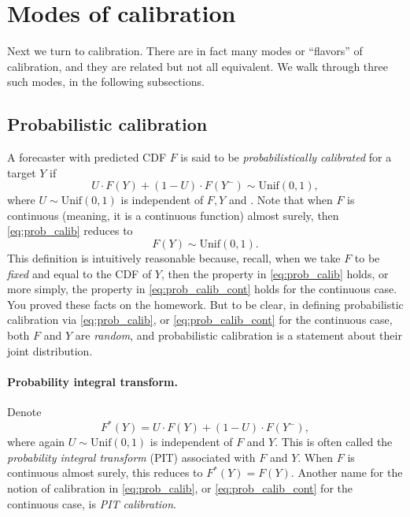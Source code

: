 \documentclass{article}
\begin{document}
\section{Modes of calibration}

Next we turn to calibration. There are in fact many modes or ``flavors'' of
calibration, and they are related but not all equivalent. We walk through three
such modes, in the following subsections.  

\subsection{Probabilistic calibration}

A forecaster with predicted CDF $F$ is said to be \emph{probabilistically 
  calibrated} for a target $Y$ if 
\begin{equation}
\label{eq:prob_calib}
U \cdot F(Y) + (1-U) \cdot F(Y^-) \sim \mathrm{Unif}(0,1),
\end{equation}
where $U \sim \mathrm{Unif}(0,1)$ is independent of $F,Y$ and . Note that when $F$ is continuous (meaning, it is a
continuous function) almost surely, then \eqref{eq:prob_calib} reduces to 
\begin{equation}
\label{eq:prob_calib_cont}
F(Y) \sim \mathrm{Unif}(0,1).
\end{equation}
This definition is intuitively reasonable because, recall, when we take $F$ to
be \emph{fixed} and equal to the CDF of $Y$, then the property in
\eqref{eq:prob_calib} holds, or more simply, the property in
\eqref{eq:prob_calib_cont} holds for the continuous case. You proved these facts
on the homework.  But to be clear, in defining probabilistic calibration via
\eqref{eq:prob_calib}, or \eqref{eq:prob_calib_cont} for the continuous case,
both $F$ and $Y$ are \emph{random}, and probabilistic calibration is a statement
about their joint distribution.

\paragraph{Probability integral transform.}

Denote
\[
F^*(Y) = U \cdot F(Y) + (1-U) \cdot F(Y^-),
\]
where again $U \sim \mathrm{Unif}(0,1)$ is independent of $F$ and $Y$. This is
often called the \emph{probability integral transform} (PIT) associated with $F$
and $Y$. When  $F$ is continuous almost surely, this reduces to $F^*(Y) =
F(Y)$. Another name for the notion of calibration in \eqref{eq:prob_calib}, or
\eqref{eq:prob_calib_cont} for the continuous case, is \emph{PIT calibration}. 
\end{document}
